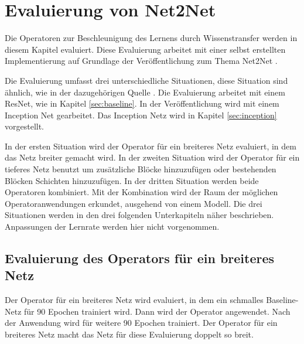 
\chapter{Evaluierung von Net2Net}\label{sec:net2netexperimente}
Die Operatoren zur Beschleunigung des Lernens durch Wissenstransfer werden in diesem Kapitel evaluiert. Diese Evaluierung arbeitet mit einer selbst erstellten Implementierung auf Grundlage der Veröffentlichung zum Thema Net2Net \cite{net2net}.

Die Evaluierung umfasst drei unterschiedliche Situationen, diese Situation sind ähnlich, wie in der dazugehörigen Quelle \cite{net2net}. Die Evaluierung arbeitet mit einem ResNet, wie in Kapitel \ref{sec:baseline}. In der Veröffentlichung wird mit einem Inception Net gearbeitet. Das Inception Netz wird in Kapitel \ref{sec:inception} vorgestellt.

In der ersten Situation wird der Operator für ein breiteres Netz evaluiert, in dem das Netz breiter gemacht wird. 
In der zweiten Situation wird der Operator für ein tieferes Netz benutzt um zusätzliche Blöcke hinzuzufügen oder bestehenden Blöcken Schichten hinzuzufügen. In der dritten Situation werden beide Operatoren kombiniert. Mit der Kombination wird der Raum der möglichen Operatoranwendungen erkundet, ausgehend von einem Modell.
Die drei Situationen werden in den drei folgenden Unterkapiteln näher beschrieben. Anpassungen der Lernrate werden hier nicht vorgenommen.

\section{Evaluierung des Operators für ein breiteres Netz}
Der Operator für ein breiteres Netz wird evaluiert, in dem ein schmalles Baseline-Netz für 90 Epochen trainiert wird. Dann wird der Operator angewendet. Nach der Anwendung wird für weitere 90 Epochen trainiert. Der Operator für ein breiteres Netz macht das Netz für diese Evaluierung doppelt so breit.


